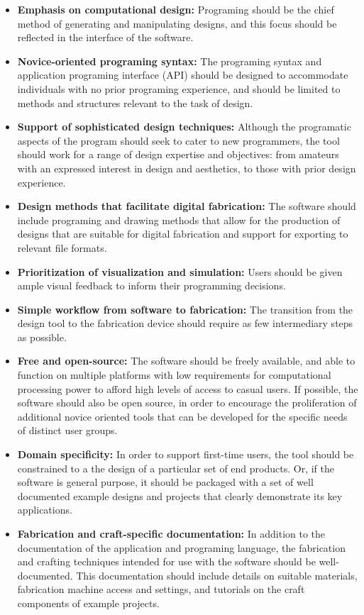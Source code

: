 	\begin{itemize}
\item \textbf{Emphasis on computational design:} Programing should be the chief method of generating and manipulating designs, and this focus should be reflected in the interface of the software. 
\item \textbf{ Novice-oriented programing syntax:} The programing syntax and application programing interface (API) should be designed to accommodate individuals with no prior programing experience, and should be limited to methods and structures relevant to the task of design. 
\item \textbf{Support of sophisticated design techniques:} Although the programatic aspects of the program should seek to cater to new programmers, the tool should work for a range of design expertise and objectives:  from amateurs with an expressed interest in design and aesthetics, to those with prior design experience. 
\item \textbf {Design methods that facilitate digital fabrication:} The software should include programing and drawing methods that allow for the production of designs that are suitable for digital fabrication and support for exporting to relevant file formats. 
\item \textbf{ Prioritization of visualization and simulation:} Users  should be given ample visual feedback to inform their programming decisions.
\item \textbf{ Simple workflow from software to fabrication:} The transition from the design tool to the fabrication device should require as few intermediary steps as possible.
\item \textbf{ Free and open-source:} The software should be freely available, and able to function on multiple platforms with low requirements for computational processing power to afford high levels of access to casual users. If possible, the software should also be open source, in order to encourage the proliferation of additional novice oriented tools that can be developed for the specific needs of distinct user groups.
\item \textbf{Domain specificity:} In order to support first-time users, the tool should be constrained to a the design of a particular set of end products. Or, if the software is general purpose, it should be packaged with a set of well documented example designs and projects that clearly demonstrate its key applications. 
\item \textbf{Fabrication and craft-specific documentation:} In addition to the documentation of the application and programing language, the fabrication and crafting techniques intended for use with the software should be well-documented. This documentation should include details on suitable materials, fabrication machine access and settings, and tutorials on the craft components of example projects.
\end{itemize}


